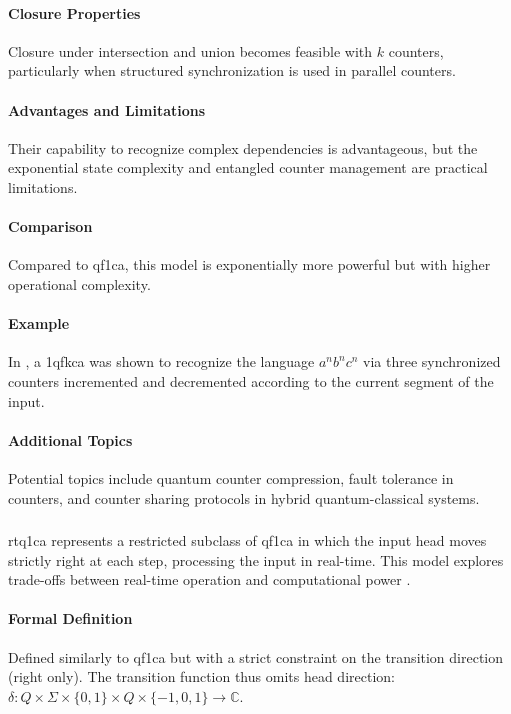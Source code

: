 \paragraph{Closure Properties}
Closure under intersection and union becomes feasible with $k$ counters, particularly when structured synchronization is used in parallel counters.

\paragraph{Advantages and Limitations}
Their capability to recognize complex dependencies is advantageous, but the exponential state complexity and entangled counter management are practical limitations.

\paragraph{Comparison}
Compared to \gls{qf1ca}, this model is exponentially more powerful but with higher operational complexity.

\paragraph{Example}
In \cite{cem2012quantum}, a \gls{1qfkca} was shown to recognize the language $a^n b^n c^n$ via three synchronized counters incremented and decremented according to the current segment of the input.

\paragraph{Additional Topics}
Potential topics include quantum counter compression, fault tolerance in counters, and counter sharing protocols in hybrid quantum-classical systems.

\subsubsection{}

\gls{rtq1ca} represents a restricted subclass of \gls{qf1ca} in which the input head moves strictly right at each step, processing the input in real-time. This model explores trade-offs between real-time operation and computational power \cite{cem2012quantum}.

\paragraph{Formal Definition}
Defined similarly to \gls{qf1ca} but with a strict constraint on the transition direction (right only). The transition function thus omits head direction: $\delta: Q \times \Sigma \times \{0,1\} \times Q \times \{-1,0,1\} \rightarrow \mathbb{C}$.

